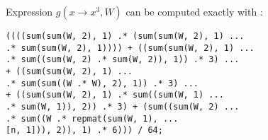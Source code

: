 Expression $g(x \rightarrow x^3, W)$ can be computed exactly with :

\begingroup
    \fontsize{8pt}{12pt}\selectfont
\begin{verbatim}
((((sum(sum(W, 2), 1) .* (sum(sum(W, 2), 1) ...
.* sum(sum(W, 2), 1)))) + ((sum(sum(W, 2), 1) ...
.* sum((sum(W, 2) .* sum(W, 2)), 1)) .* 3) ...
+ ((sum(sum(W, 2), 1) ...
.* sum(sum((W .* W), 2), 1)) .* 3) ...
+ ((sum(sum(W, 2), 1) .* sum((sum(W, 1) ...
.* sum(W, 1)), 2)) .* 3) + (sum((sum(W, 2) ...
.* sum((W .* repmat(sum(W, 1), ...
[n, 1])), 2)), 1) .* 6))) / 64;
\end{verbatim}
\endgroup



